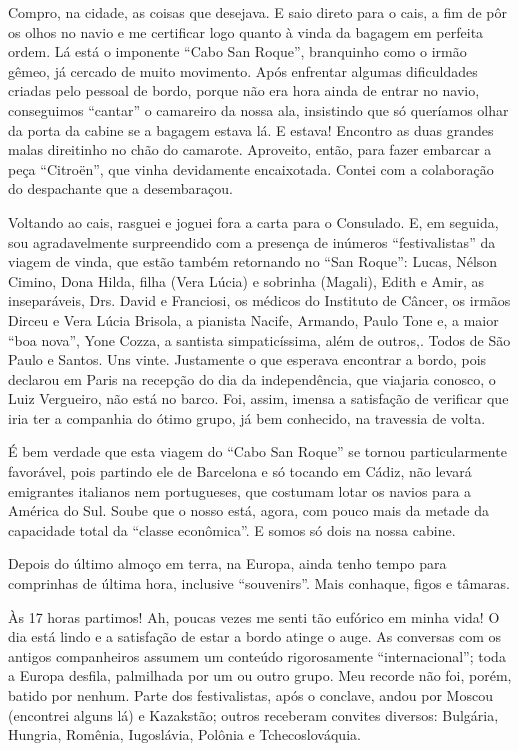 Compro, na cidade, as coisas que desejava. E saio direto para o cais, a fim de pôr os olhos no navio e me certificar logo quanto à vinda da bagagem em perfeita ordem. Lá está o imponente ``Cabo San Roque'', branquinho como o irmão gêmeo, já cercado de muito movimento. Após enfrentar algumas dificuldades criadas pelo pessoal de bordo, porque não era hora ainda de entrar no navio, conseguimos ``cantar'' o camareiro da nossa ala, insistindo que só queríamos olhar da porta da cabine se a bagagem estava lá. E estava! Encontro as duas grandes malas direitinho no chão do camarote. Aproveito, então, para fazer embarcar a peça ``Citroën'', que vinha devidamente encaixotada. Contei com a colaboração do despachante que a desembaraçou.

Voltando ao cais, rasguei e joguei fora a carta para o Consulado. E, em seguida, sou agradavelmente surpreendido com a presença de inúmeros ``festivalistas'' da viagem de vinda, que estão também retornando no ``San Roque'': Lucas, Nélson Cimino, Dona Hilda, filha (Vera Lúcia) e sobrinha (Magali), Edith e Amir, as inseparáveis, Drs. David e Franciosi, os médicos do Instituto de Câncer, os irmãos Dirceu e Vera Lúcia Brisola, a pianista Nacife, Armando, Paulo Tone e, a maior ``boa nova'', Yone Cozza, a santista simpaticíssima, além de outros,. Todos de São Paulo e Santos. Uns vinte. Justamente o que esperava encontrar a bordo, pois declarou em Paris na recepção do dia da independência, que viajaria conosco, o Luiz Vergueiro, não está no barco. Foi, assim, imensa a satisfação de verificar que iria ter a companhia do ótimo grupo, já bem conhecido, na travessia de volta.

É bem verdade que esta viagem do ``Cabo San Roque'' se tornou particularmente favorável, pois partindo ele de Barcelona e só tocando em Cádiz, não levará emigrantes italianos nem portugueses, que costumam lotar os navios para a América do Sul. Soube que o nosso está, agora, com pouco mais da metade da capacidade total da ``classe econômica''. E somos só dois na nossa cabine.

Depois do último almoço em terra, na Europa, ainda tenho tempo para comprinhas de última hora, inclusive ``souvenirs''. Mais conhaque, figos e tâmaras.

Às 17 horas partimos! Ah, poucas vezes me senti tão eufórico em minha vida! O dia está lindo e a satisfação de estar a bordo atinge o auge. As conversas com os antigos companheiros assumem um conteúdo rigorosamente ``internacional''; toda a Europa desfila, palmilhada por um ou outro grupo. Meu recorde não foi, porém, batido por nenhum. Parte dos festivalistas, após o conclave, andou por Moscou (encontrei alguns lá) e Kazakstão; outros receberam convites diversos: Bulgária, Hungria, Romênia, Iugoslávia, Polônia e Tchecoslováquia.

